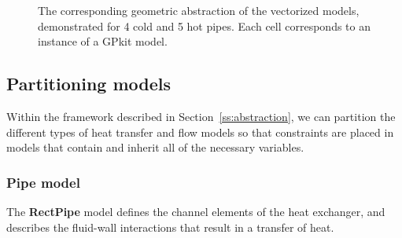 \documentclass{article}
\begin{document}
\begin{center}
\begin{figure}
\centering
{}
\caption{\textnormal{The corresponding geometric abstraction of the vectorized models, demonstrated for 4 cold and 5 hot pipes. Each cell corresponds to an instance of a GPkit model.}}
\end{figure}
\end{center}

\subsection{Partitioning models}

Within the framework described in Section~\ref{ss:abstraction}, we can partition the different types of heat transfer and flow models so that constraints are placed in models that contain and inherit all of the necessary variables. 

\subsubsection{\textbf{Pipe} model}

The \textbf{RectPipe} model defines the channel elements of the heat exchanger, and describes the fluid-wall interactions that result in a transfer of heat. 



\end{document}
